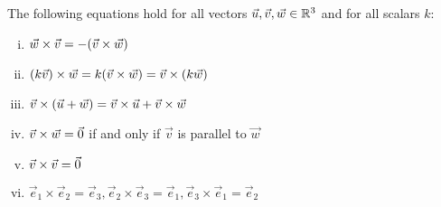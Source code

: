 \documentclass[a4paper,11pt]{article}
\begin{document}
\begin{outline}
    The following equations hold for all vectors \(\vec{u}, \vec{v}, \vec{w} \in \mathbb{R}^3\) and for all scalars \(k\):
    \begin{enumerate}[i.]
      \item \(\vec{w}\times\vec{v} = -(\vec{v}\times\vec{w})\)
      \item \((k\vec{v})\times\vec{w} = k(\vec{v}\times\vec{w}) = \vec{v}\times(k\vec{w})\)
      \item \(\vec{v}\times(\vec{u}+\vec{w})=\vec{v}\times\vec{u}+\vec{v}\times\vec{w}\)
      \item \(\vec{v}\times\vec{w}=\vec{0}\) if and only if \(\vec{v}\) is parallel to \(\vec{w}\)
      \item \(\vec{v}\times\vec{v} = \vec{0}\)
      \item \(\vec{e}_1\times\vec{e}_2=\vec{e}_3,\vec{e}_2\times\vec{e}_3=\vec{e}_1,\vec{e}_3\times\vec{e}_1=\vec{e}_2\)
    \end{enumerate}

\end{outline}
\end{document}
